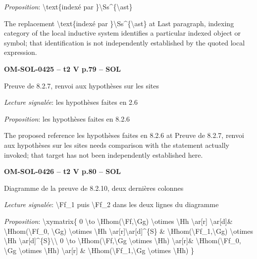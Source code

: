 \emph{Proposition}: \textbackslash{}text\{indexé par \}\textbackslash{}Ss\textasciicircum{}\{\textbackslash{}ast\}\par
The replacement \textbackslash{}text\{indexé par \}\textbackslash{}Ss\textasciicircum{}\{\textbackslash{}ast\} at Last paragraph, indexing category of the local inductive system identifies a particular indexed object or symbol; that identification is not independently established by the quoted local expression.\par
\par\noindent\textbf{OM-SOL-0425 -- t2 V p.79 -- SOL}\par
Preuve de 8.2.7, renvoi aux hypothèses sur les sites\par
\emph{Lecture signalée}: les hypothèses faites en 2.6\par
\emph{Proposition}: les hypothèses faites en 8.2.6\par
The proposed reference les hypothèses faites en 8.2.6 at Preuve de 8.2.7, renvoi aux hypothèses sur les sites needs comparison with the statement actually invoked; that target has not been independently established here.\par
\par\noindent\textbf{OM-SOL-0426 -- t2 V p.80 -- SOL}\par
Diagramme de la preuve de 8.2.10, deux dernières colonnes\par
\emph{Lecture signalée}: \textbackslash{}Ff\_1 puis \textbackslash{}Ff\_2 dans les deux lignes du diagramme\par
\emph{Proposition}: \textbackslash{}xymatrix\{ 0 \textbackslash{}to \textbackslash{}Hhom(\textbackslash{}Ff,\textbackslash{}Gg) \textbackslash{}otimes \textbackslash{}Hh \textbackslash{}ar[r] \textbackslash{}ar[d]\& \textbackslash{}Hhom(\textbackslash{}Ff\_0, \textbackslash{}Gg) \textbackslash{}otimes \textbackslash{}Hh \textbackslash{}ar[r]\textbackslash{}ar[d]\textasciicircum{}\{S\} \& \textbackslash{}Hhom(\textbackslash{}Ff\_1,\textbackslash{}Gg) \textbackslash{}otimes \textbackslash{}Hh \textbackslash{}ar[d]\textasciicircum{}\{S\}\textbackslash{}\textbackslash{} 0 \textbackslash{}to \textbackslash{}Hhom(\textbackslash{}Ff,\textbackslash{}Gg \textbackslash{}otimes \textbackslash{}Hh) \textbackslash{}ar[r]\& \textbackslash{}Hhom(\textbackslash{}Ff\_0, \textbackslash{}Gg \textbackslash{}otimes \textbackslash{}Hh) \textbackslash{}ar[r] \& \textbackslash{}Hhom(\textbackslash{}Ff\_1,\textbackslash{}Gg \textbackslash{}otimes \textbackslash{}Hh) \}\par
